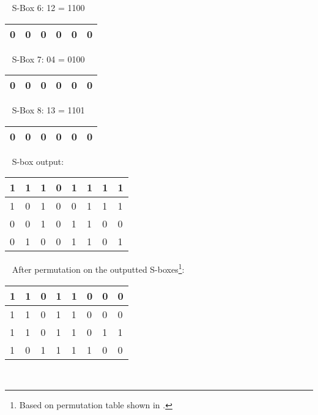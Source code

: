 ~
\vspace{1em}\newline
\noindent
S-Box 6: 12 = 1100 \\
\begin{tabular}{ | l | l | l | l | l | l | } \hline 
	0 & 0 & 0 & 0 & 0 &  0 \\ \hline
\end{tabular}
~
\vspace{1em}\newline
\noindent
S-Box 7: 04 = 0100 \\
\begin{tabular}{ | l | l | l | l | l | l | } \hline 
	0 & 0 & 0 & 0 & 0 &  0 \\ \hline
\end{tabular}
~
\vspace{1em}\newline
\noindent
S-Box 8: 13 = 1101 \\
\begin{tabular}{ | l | l | l | l | l | l | } \hline 
	0 & 0 & 0 & 0 & 0 &  0 \\ \hline
\end{tabular}
~
\vspace{0.5em}\newline
\noindent
S-box output: \\
\begin{tabular}{ | l | l | l | l | l | l | l |  l | } \hline 
	1 & 1 & 1 & 0 & 1 &  1 & 1 & 1 \\ \hline
	1 & 0 & 1 & 0 & 0 &  1 & 1 & 1 \\ \hline
	0 & 0 & 1 & 0 & 1 &  1 & 0 & 0 \\ \hline
	0 & 1 & 0 & 0 & 1 &  1 & 0 & 1 \\ \hline
\end{tabular}
~
\vspace{0.5em}\newline
\noindent
After permutation on the outputted S-boxes\footnote{Based on permutation table shown in \cite[p.~66]{Paar2010}.}: \\
\begin{tabular}{ | l | l | l | l | l | l | l |  l | } \hline 
	1 & 1 & 0 & 1 & 1 &  0 & 0 & 0 \\ \hline
	1 & 1 & 0 & 1 & 1 &  0 & 0 & 0 \\ \hline
	1 & 1 & 0 & 1 & 1 &  0 & 1 & 1 \\ \hline
	1 & 0 & 1 & 1 & 1 &  1 & 0 & 0 \\ \hline
\end{tabular} \\
